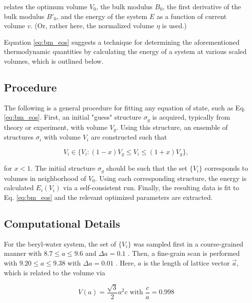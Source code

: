             \noindent relates the optimum volume $V_0$, the bulk modulus $B_0$, the first derivative of the bulk modulus $B'_0$, and the energy of the system $E$ as a function of current volume $v$. (Or, rather here, the normalized volume $\eta$ is used.)
            
            Equation \ref{eq:bm_eos} suggests a technique for determining the aforementioned thermodynamic quantities by calculating the energy of a system at various scaled volumes, which is outlined below.
        \subsection{Procedure}
        
        The following is a general procedure for fitting any equation of state, such as Eq. \ref{eq:bm_eos}. First, an initial "guess" structure $\sigma_g$ is acquired, typically from theory or experiment, with volume $V_g$. Using this structure, an ensemble of structures $\sigma_i$ with volume $V_i$ are constructed such that
        
        \begin{equation}
        \label{eq:ensem_eos}
            V_i \in \{ V_i : (1-x)V_g \le V_i \le (1+x) V_g \},
        \end{equation}
        
        \noindet for $x<1$. The initial structure $\sigma_g$ should be such that the set $\{V_i\}$ corresponds to volumes in neighborhood of $V_0$. Using each corresponding structure, the energy is calculated $E_i(V_i)$ via a self-consistent run. Finally, the resulting data is fit to Eq. \ref{eq:bm_eos} and the relevant optimized parameters are extracted.
        
        \subsection{Computational Details}
        
            For the beryl-water system, the set of $\{ V_i\}$ was sampled first in a course-grained manner with $8.7 \le a \le 9.6$ \angstrom  and $\Delta a = 0.1$ \angstrom. Then, a fine-grain scan is performed with $9.20 \le a \le 9.38$ \angstrom with $\Delta a=0.01$ \angstrom. Here, $a$ is the length of lattice vector $\Vec{a}$, which is related to the volume via
            
            \begin{equation}
                V(a) = \frac{\sqrt{3}}{2} a^2 c \text{ with } \frac{c}{a} = 0.998
            \end{equation}
            
